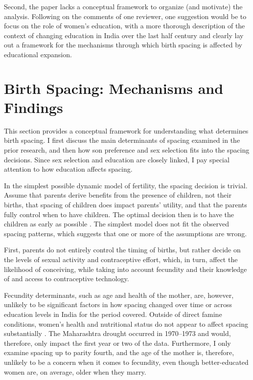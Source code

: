 Second, the paper lacks a conceptual framework to organize (and
motivate) the analysis. Following on the comments of one reviewer, one
suggestion would be to focus on the role of women’s education, with a
more thorough description of the context of changing education in India
over the last half century and clearly lay out a framework for the
mechanisms through which birth spacing is affected by educational
expansion.

\section{Birth Spacing: Mechanisms and Findings}

This section provides a conceptual framework for understanding what determines  
birth spacing.
I first discuss the main determinants of spacing examined in the prior research, and 
then how son preference and sex selection fits into the spacing decisions.
Since sex selection and education are closely linked, I pay special attention to how 
education affects spacing.

In the simplest possible dynamic model of fertility, the spacing decision is trivial.
Assume that parents derive benefits from the presence of children, not their births, 
that spacing of children does impact parents' utility, 
and that the parents fully control when to have children. 
The optimal decision then is to have the children as early as possible 
\citep{Newman1988}.
The simplest model does not fit the observed spacing patterns, which suggests 
that one or more of the assumptions are wrong.

First, parents do not entirely control the timing of births, but rather decide on 
the levels of sexual activity and contraceptive effort, which, in turn, affect the 
likelihood of conceiving, while taking into account fecundity and their knowledge 
of and access to contraceptive technology.

Fecundity determinants, such as age and health of the mother, are, however, unlikely 
to be significant factors in how spacing changed over time or across education levels 
in India for the period covered.
Outside of direct famine conditions, women's health and nutritional status do not 
appear to affect spacing substantially \citep{Huffman1987,John1987,lindstrom99}.
The Maharashtra drought occurred in 1970--1973 and would, therefore, only impact the first
year or two of the data.
Furthermore, I only examine spacing up to parity fourth, and the age of the mother is,
therefore, unlikely to be a concern when it comes to fecundity, even though 
better-educated women are, on average, older when they marry. 

